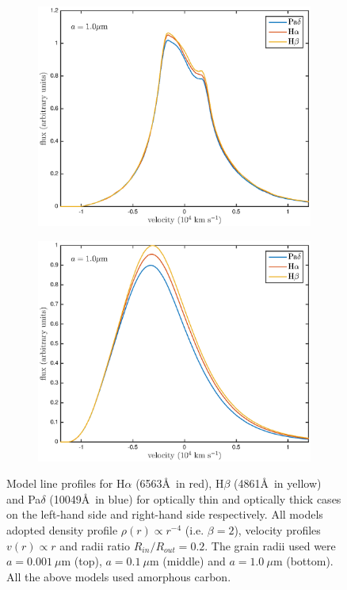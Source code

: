 \begin{figure}
\begin{subfigure}{0.5\textwidth}
\includegraphics[trim =30 0 45 15,clip=true,scale=0.45]{chapters/chapter4/images/dustdep/a1_opt_thin_HaHbPad}
\end{subfigure}
\hspace{3mm}
\begin{subfigure}{0.5\textwidth}
\includegraphics[trim =51 0 45 15,clip=true,scale=0.45]{chapters/chapter4/images/dustdep/a1_opt_thick_HaHbPad}
\end{subfigure}
\caption{Model line profiles for H$\alpha$ (6563\AA\ in red), H$\beta$ (4861\AA\ in yellow) and Pa$\delta$ (10049\AA\ in blue) for optically thin and  optically thick cases on the left-hand side and right-hand side respectively.  All models adopted density profile $\rho(r) \propto r^{-4}$ (i.e. $\beta = 2$), velocity profiles $v(r) \propto r$ and radii ratio $R_{in}/R_{out}=0.2$.  The grain radii used were $a=0.001~\mu$m (top), $a=0.1~\mu$m (middle) and $a=1.0~\mu$m (bottom). All the above models used amorphous carbon.}
\label{wav_dep}
\end{figure}

